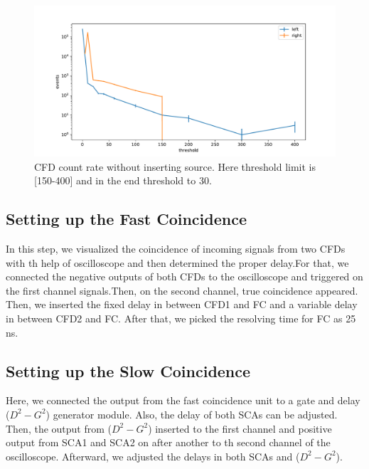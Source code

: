 \begin{figure}[htbp]
	\centering
	\includegraphics[width=0.8\linewidth]{./figs/cfd2.pdf}
	\caption{CFD count rate without inserting source. Here threshold limit is [150-400] and in the end threshold to 30.}%
	\label{fig:angAsymm}
\end{figure}

\subsection{Setting up the Fast Coincidence}
In this step, we visualized the coincidence of incoming signals from two CFDs with th help of oscilloscope and then determined the proper delay.For that, we connected the negative outputs of both CFDs to the oscilloscope and triggered on the first channel signals.Then, on the second channel, true coincidence appeared. Then, we inserted the fixed delay in between CFD1 and FC and a variable delay in between CFD2 and FC. After that, we picked the resolving time for FC as 25 ns.

\subsection{Setting up the Slow Coincidence}
Here, we connected the output from the fast coincidence unit to a gate and delay ($ D^{2}-G^{2} $) generator module. Also, the delay of both SCAs can be adjusted. Then, the output from ($ D^{2}-G^{2} $) inserted to the first channel and positive output from SCA1 and SCA2 on after another to th second channel of the oscilloscope. Afterward, we adjusted the delays in both SCAs and ($ D^{2}-G^{2} $). 

